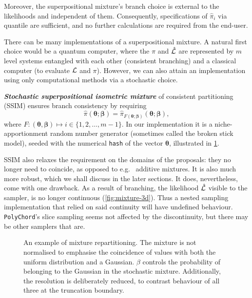 \documentclass[usenatbib]{mnras}
\begin{document}
Moreover, the superpositional mixture's branch choice is external to
the likelihoods and independent of them. Consequently, specifications
of $\hat{\pi}_{i}$ via quantile are sufficient, and no further
calculations are required from the end-user.

There can be many implementations of a superpositional mixture. A
natural first choice would be a quantum computer, where the
$\hat{\pi}$ and $\hat{\cal L}$ are represented by \(m\) level systems
entangled with each other (consistent branching) and a classical
computer (to evaluate ${\cal L}$ and $\pi$). However, we can also
attain an implementation using only computational methods via a
stochastic choice.

\textbf{\emph{Stochastic superpositional isometric mixture}} of consistent
partitioning (SSIM) ensures branch consistency by requiring
\begin{equation}
\hat{\pi}(\bm{\theta}; \bm{\beta}) = \hat{\pi}_{F(\bm{\theta};
  \bm{\beta})}(\bm{\theta};\bm{\beta}),
\end{equation}
where
$F: (\bm{\theta}, \bm{\beta}) \mapsto i \in \{1, 2, \ldots, m-1\}$. In
our implementation it is a niche-apportionment random number generator
(sometimes called the broken stick model), seeded with the numerical
\texttt{hash} of the vector $\bm{\theta}$, illustrated in
\cref{fig:mixture}.

SSIM also relaxes the requirement on the domains of the proposals:
they no longer need to coincide, as opposed to e.g.~ additive
mixtures.  It is also much more robust, which we shall discuss in the
later sections. It does, nevertheless, come with one drawback. As a
result of branching, the likelihood $\hat{\cal L}$ visible to the
sampler, is no longer continuous (\cref{fig:mixture-3d}). Thus a
nested sampling implementation that relied on said continuity will
have undefined behaviour. \texttt{PolyChord}'s slice sampling seems
not affected by the discontinuity, but there may be other samplers
that are.
\begin{figure}  
  

  

  
  \caption{An example of mixture repartitioning. The mixture is not
    normalised to emphasise the coincidence of values with both the
    uniform distribution and a Gaussian. $\beta$ controls the
    probability of belonging to the Gaussian in the stochastic
    mixture.  Additionally, the resolution is deliberately reduced, to
    contrast behaviour of all three at the truncation
    boundary. \label{fig:mixture}}
\end{figure}
\end{document}
